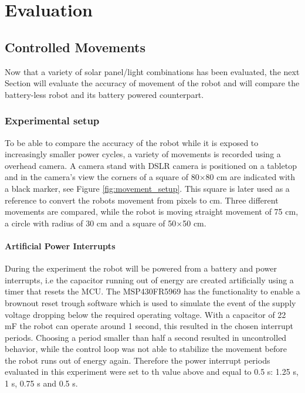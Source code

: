 \chapter{Evaluation} 


\section{Controlled Movements}
\label{sec:controlled_movements}




Now that a variety of solar panel/light combinations has been evaluated, the next Section will evaluate the accuracy of movement of the robot and will compare the battery-less robot and its battery powered counterpart.

\subsection{Experimental setup}

To be able to compare the accuracy of the robot while it is exposed to increasingly smaller power cycles, a variety of movements is recorded using a overhead camera.
A camera stand with DSLR camera is positioned on a tabletop and in the camera's view the corners of a square of 80$\times$80 cm are indicated with a black marker, see Figure \ref{fig:movement_setup}.
This square is later used as a reference to convert the robots movement from pixels to cm.
Three different movements are compared, while the robot is moving straight movement of 75 cm, a circle with radius of 30 cm and a square of 50$\times$50 cm.

\subsubsection{Artificial Power Interrupts}

During the experiment the robot will be powered from a battery and power interrupts, i.e the capacitor running out of energy are created artificially using a timer that resets the MCU.
The MSP430FR5969 has the functionality to enable a brownout reset trough software which is used to simulate the event of the supply voltage dropping below the required operating voltage.
With a capacitor of 22 mF the robot can operate around 1 second, this resulted in the chosen interrupt periods.
Choosing a period smaller than half a second resulted in uncontrolled behavior, while the control loop was not able to stabilize the movement before the robot runs out of energy again.
Therefore the power interrupt periods evaluated in this experiment were set to th value above and equal to 0.5 s: 1.25 s, 1 s, 0.75 s and 0.5 s.

